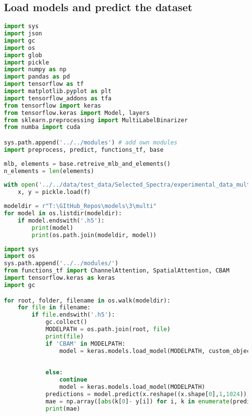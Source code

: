 \hypertarget{load-models-and-predict-the-dataset}{%
\subsection{Load models and predict the
dataset}\label{load-models-and-predict-the-dataset}}

\begin{lstlisting}[language=Python]
import sys
import json
import gc
import os
import glob
import pickle
import numpy as np
import pandas as pd
import tensorflow as tf
import matplotlib.pyplot as plt
import tensorflow_addons as tfa
from tensorflow import keras
from tensorflow.keras import Model, layers
from sklearn.preprocessing import MultiLabelBinarizer
from numba import cuda

sys.path.append('../../modules') # add own modules
import preprocess, predict, functions_tf, base
\end{lstlisting}

\begin{lstlisting}[language=Python]
mlb, elements = base.retreive_mlb_and_elements()
n_elements = len(elements)
\end{lstlisting}

\begin{lstlisting}[language=Python]
with open('../../data/test_data/Selected_Spectra/experimental_data_multi.pkl', 'rb') as f:
    x, y = pickle.load(f)
\end{lstlisting}

\begin{lstlisting}[language=Python]
modeldir = r"T:\GItHub_Repos\models\3\multi"
for model in os.listdir(modeldir):
    if model.endswith('.h5'):
        print(model)
        print(os.path.join(modeldir, model))
\end{lstlisting}

\begin{lstlisting}[language=Python]
import sys
import os
sys.path.append('../../modules/')
from functions_tf import ChannelAttention, SpatialAttention, CBAM
import tensorflow.keras as keras
import gc

for root, folder, filename in os.walk(modeldir):
    for file in filename:
        if file.endswith('.h5'):
            gc.collect()
            MODELPATH = os.path.join(root, file)
            print(file)
            if 'CBAM' in MODELPATH:
                model = keras.models.load_model(MODELPATH, custom_objects={'ChannelAttention': ChannelAttention,
                                                                           'SpatialAttention': SpatialAttention,
                                                                           'CBAM': CBAM})
            else:
                continue
                model = keras.models.load_model(MODELPATH)
            predictions = model.predict(x.reshape((x.shape[0],1,1024)), verbose=1)
            mae = np.array([abs(k[0]- y[i]) for i, k in enumerate(predictions)]).mean()
            print(mae)
            
\end{lstlisting}

